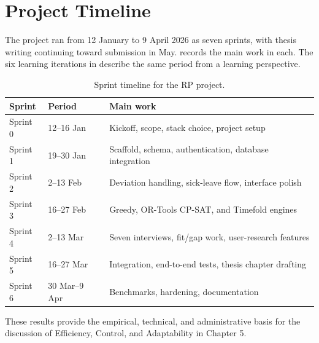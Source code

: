 \section{Project Timeline}
\label{sec:project-timeline}
\label{sec:administrative-results}
\label{sec:sprint-summary}

The project ran from 12 January to 9 April 2026 as seven sprints, with thesis writing continuing toward submission in May.  records the main work in each. The six learning iterations in  describe the same period from a learning perspective.

\begin{table}[h]
\centering
\caption{Sprint timeline for the RP project.}
\label{tab:sprint-timeline}
\small
\begin{tabularx}{\textwidth}{@{}
  p{}
  p{}
  X
@{}}
\toprule
\textbf{Sprint} & \textbf{Period} & \textbf{Main work} \\
\midrule
Sprint 0 & 12--16 Jan & Kickoff, scope, stack choice, project setup \\
Sprint 1 & 19--30 Jan & Scaffold, schema, authentication, database integration \\
Sprint 2 & 2--13 Feb & Deviation handling, sick-leave flow, interface polish \\
Sprint 3 & 16--27 Feb & Greedy, OR-Tools CP-SAT, and Timefold engines \\
Sprint 4 & 2--13 Mar & Seven interviews, fit/gap work, user-research features \\
Sprint 5 & 16--27 Mar & Integration, end-to-end tests, thesis chapter drafting \\
Sprint 6 & 30 Mar--9 Apr & Benchmarks, hardening, documentation \\
\bottomrule
\end{tabularx}
\end{table}

These results provide the empirical, technical, and administrative basis for the discussion of Efficiency, Control, and Adaptability in Chapter 5.
